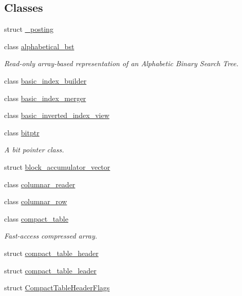 \subsection*{Classes}
\begin{DoxyCompactItemize}
\item 
struct \mbox{\hyperlink{structirk_1_1__posting}{\+\_\+posting}}
\item 
class \mbox{\hyperlink{classirk_1_1alphabetical__bst}{alphabetical\+\_\+bst}}
\begin{DoxyCompactList}\small\item\em Read-\/only array-\/based representation of an Alphabetic Binary Search Tree. \end{DoxyCompactList}\item 
class \mbox{\hyperlink{classirk_1_1basic__index__builder}{basic\+\_\+index\+\_\+builder}}
\item 
class \mbox{\hyperlink{classirk_1_1basic__index__merger}{basic\+\_\+index\+\_\+merger}}
\item 
class \mbox{\hyperlink{classirk_1_1basic__inverted__index__view}{basic\+\_\+inverted\+\_\+index\+\_\+view}}
\item 
class \mbox{\hyperlink{classirk_1_1bitptr}{bitptr}}
\begin{DoxyCompactList}\small\item\em A bit pointer class. \end{DoxyCompactList}\item 
struct \mbox{\hyperlink{structirk_1_1block__accumulator__vector}{block\+\_\+accumulator\+\_\+vector}}
\item 
class \mbox{\hyperlink{classirk_1_1columnar__reader}{columnar\+\_\+reader}}
\item 
class \mbox{\hyperlink{classirk_1_1columnar__row}{columnar\+\_\+row}}
\item 
class \mbox{\hyperlink{classirk_1_1compact__table}{compact\+\_\+table}}
\begin{DoxyCompactList}\small\item\em Fast-\/access compressed array. \end{DoxyCompactList}\item 
struct \mbox{\hyperlink{structirk_1_1compact__table__header}{compact\+\_\+table\+\_\+header}}
\item 
struct \mbox{\hyperlink{structirk_1_1compact__table__leader}{compact\+\_\+table\+\_\+leader}}
\item 
struct \mbox{\hyperlink{structirk_1_1CompactTableHeaderFlags}{Compact\+Table\+Header\+Flags}}

\end{DoxyCompactItemize}
